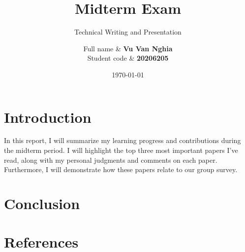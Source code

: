 \documentclass[12pt, twoside]{article}
\title{Midterm Exam}
\subtitle{Technical Writing and Presentation}
\author{
    Full name & \textbf{Vu Van Nghia} \\
    Student code &   \textbf{20206205} \\[1cm]
}
\date{\today}
\begin{document}
\maketitlepage
\newpage
\section{Introduction}
In this report, I will summarize my learning progress and contributions during the midterm period. I will highlight the top three most important papers I've read, along with my personal judgments and comments on each paper. Furthermore, I will demonstrate how these papers relate to our group survey.
\section{Conclusion}
\section{References}
\end{document}
